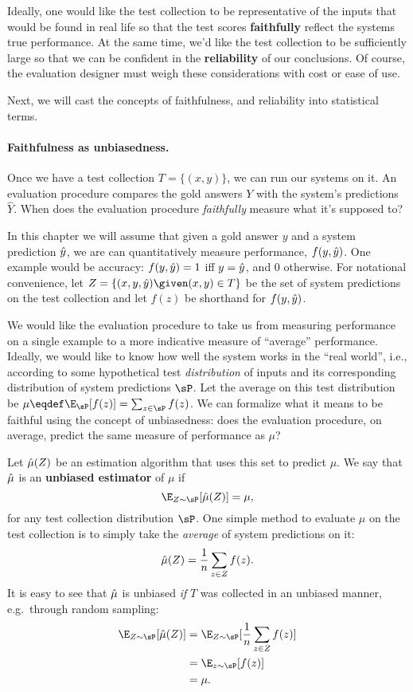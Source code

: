 Ideally, one would like the test collection to be representative of the inputs that would be found in real life so that the test scores \textbf{faithfully} reflect the systems true performance.
At the same time, we'd like the test collection to be sufficiently large so that we can be confident in the \textbf{reliability} of our conclusions.
Of course, the evaluation designer must weigh these considerations with cost or ease of use.

Next, we will cast the concepts of faithfulness, and reliability into statistical terms.

\paragraph{Faithfulness as unbiasedness.}
Once we have a test collection $T = \{(x, y)\}$, we can run our systems on it.
An evaluation procedure compares the gold answers $Y$ with the system's predictions $\hat{Y}$.
When does the evaluation procedure \textit{faithfully} measure what it's supposed to?

In this chapter we will assume that given a gold answer $y$ and a system prediction $\hat{y}$, we are can quantitatively measure performance, $f(y, \hat{y})$.
One example would be accuracy: $f(y, \hat{y}) = 1$ iff $y = \hat{y}$, and $0$ otherwise.
For notational convenience, let $Z = \{(x, y, \yh) \given (x, y) \in T\}$ be the set of system predictions on the test collection and let $f(z)$ be shorthand for $f(y, \hat{y})$.

We would like the evaluation procedure to take us from measuring performance on a single example to a more indicative measure of ``average'' performance.
Ideally, we would like to know how well the system works in the ``real world'', i.e., according to some hypothetical test \textit{distribution} of inputs and its corresponding distribution of system predictions $\sP$.
Let the average on this test distribution be $\mu \eqdef \E_{\sP}[f(z)] = \sum_{z \in \sP} f(z)$.
We can formalize what it means to be faithful using the concept of unbiasedness: does the evaluation procedure, on average, predict the same measure of performance as $\mu$?

Let $\hat{\mu}(Z)$ be an estimation algorithm that uses this set to predict $\mu$.
We say that $\hat{\mu}$ is an \textbf{unbiased estimator} of $\mu$ if
\[
\E_{Z\sim \sP}[\muh(Z)] = \mu,
\]
for any test collection distribution $\sP$. 
One simple method to evaluate $\mu$ on the test collection is to simply take the \textit{average} of system predictions on it:
\[
\hat{\mu}(Z) = \frac{1}{n} \sum_{z \in Z} f(z).
\]
It is easy to see that $\hat{\mu}$ is unbiased \textit{if} $T$ was collected in an unbiased manner, e.g.\ through random sampling:
\begin{align*}
  \E_{Z \sim \sP}[\muh(Z)] 
    &= \E_{Z \sim \sP}[\frac{1}{n} \sum_{z \in Z} f(z)] \\
    &= \E_{z \sim \sP}[f(z)] \\
    &= \mu.
\end{align*}

